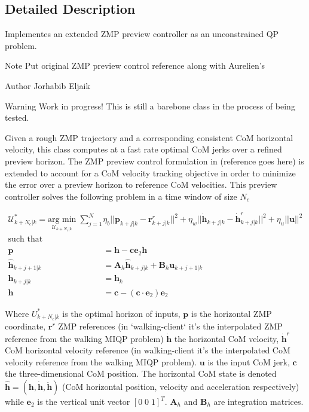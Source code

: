 \subsection{\-Detailed \-Description}
\-Implementes an extended \-Z\-M\-P preview controller as an unconstrained \-Q\-P problem. 

\begin{DoxyNote}{\-Note}
\-Put original \-Z\-M\-P preview control reference along with \-Aurelien's
\end{DoxyNote}
\begin{DoxyAuthor}{\-Author}
\-Jorhabib \-Eljaik
\end{DoxyAuthor}
\cite{ibanezThesis2015}

\begin{DoxyWarning}{\-Warning}
\-Work in progress! \-This is still a barebone class in the process of being tested.
\end{DoxyWarning}
\-Given a rough \-Z\-M\-P trajectory and a corresponding consistent \-Co\-M horizontal velocity, this class computes at a fast rate optimal \-Co\-M jerks over a refined preview horizon. \-The \-Z\-M\-P preview control formulation in (reference goes here) is extended to account for a \-Co\-M velocity tracking objective in order to minimize the error over a preview horizon to reference \-Co\-M velocities. \-This preview controller solves the following problem in a time window of size $N_c$

\begin{align*} \mathcal{U}_{k+N_c|k}^* = \underset{\mathcal{U}_{k+N_c|k}}{\text{arg min}} \; \sum_{j=1}^{N} & \eta_b || \mathbf{p}_{k+j|k} - \mathbf{r}_{k+j|k}^r ||^2 + \eta_w ||\mathbf{\dot{h}}_{k+j|k} - \dot{\mathbf{h}}^r_{k+j|k} ||^2 + \eta_u || \mathbf{u} ||^2 \\ \text{such that}&\\ \mathbf{p} &= \mathbf{h} - \mathbf{c}\mathbf{e}_2 \mathbf{\ddot{h}} \\ \mathbf{\hat{h}}_{k+j+1|k} &= \mathbf{A}_h \hat{\mathbf{h}}_{k+j|k} + \mathbf{B}_h \mathbf{u}_{k+j+1|k} \\ \mathbf{h}_{k+j|k} &= \mathbf{h}_k\\ \mathbf{h} &= \mathbf{c} - (\mathbf{c}\cdot\mathbf{e}_2)\mathbf{e}_2 \end{align*}

\-Where ${U}_{k+N_c|k}^*$ is the optimal horizon of inputs, $\mathbf{p}$ is the horizontal \-Z\-M\-P coordinate, $ \mathbf{r}^r $ \-Z\-M\-P references (in `walking-\/client` it's the interpolated \-Z\-M\-P reference from the walking \-M\-I\-Q\-P problem) $ \mathbf{\dot{h}} $ the horizontal \-Co\-M velocity, $ \mathbf{\dot{h}}^r $ \-Co\-M horizontal velocity reference (in walking-\/client it's the interpolated \-Co\-M velocity reference from the walking \-M\-I\-Q\-P problem). $\mathbf{u}$ is the input \-Co\-M jerk, $\mathbf{c}$ the three-\/dimensional \-Co\-M position. \-The horizontal \-Co\-M state is denoted $\hat{\mathbf{h}} = (\mathbf{h}, \mathbf{\dot{h}}, \mathbf{\ddot{h}}) $ (\-Co\-M horizontal position, velocity and acceleration respectively) while $\mathbf{e}_2$ is the vertical unit vector $ [0\;0\;1]^T$. $\mathbf{A}_h$ and $\mathbf{B}_h$ are integration matrices.


